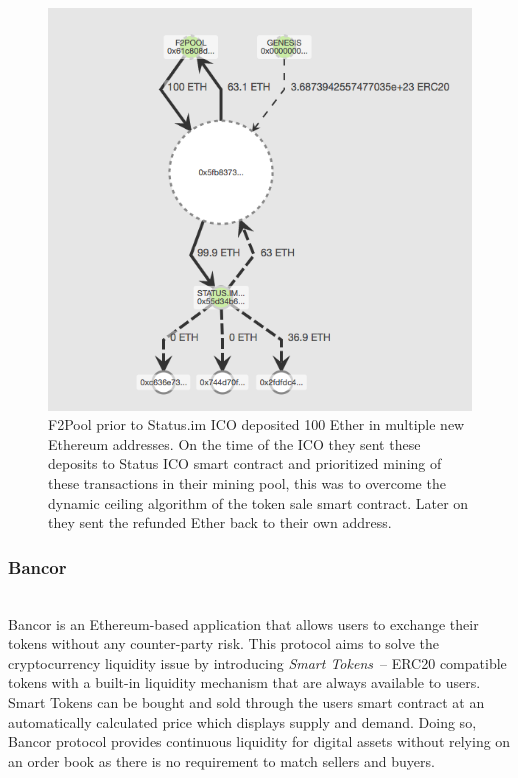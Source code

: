 

\begin{figure}[h]
\centering
\includegraphics[width=0.5\linewidth]{figures/F2Pool_transactions_to_StatusICO_and_Refunds.png}
\caption{F2Pool prior to Status.im ICO deposited 100 Ether in multiple new Ethereum addresses. On the time of the ICO they sent these deposits to Status ICO smart contract and prioritized mining of these transactions in their mining pool, this was to overcome the dynamic ceiling algorithm of the token sale smart contract. Later on they sent the refunded Ether back to their own address.\label{fig:f2poolfrontrun}}
\end{figure}





\subsubsection{Bancor} \hfill\\
\noindent Bancor is an Ethereum-based application that allows users to exchange their tokens without any counter-party risk. This protocol aims to solve the cryptocurrency liquidity issue by introducing \textit{Smart Tokens}~\cite{hertzog2017bancor}-- ERC20 compatible tokens with a built-in liquidity mechanism that are always available to users. Smart Tokens can be bought and sold through the users smart contract at an automatically calculated price which displays supply and demand. Doing so, Bancor protocol provides continuous liquidity for digital assets without relying on an order book as there is no requirement to match sellers and buyers.

